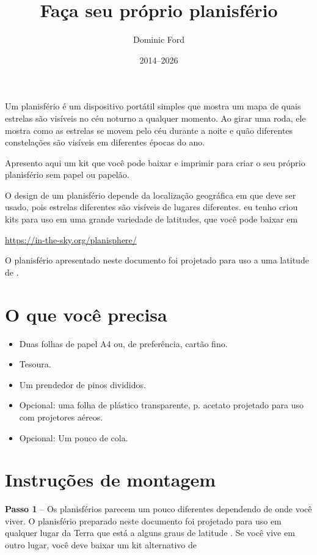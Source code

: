 \documentclass[a4paper,onecolumn,10pt]{article}
\title{Faça seu próprio planisfério}
\author{Dominic Ford}
\date{2014--2026}
\begin{document}
\maketitle
\setcounter{footnote}{1}

Um planisfério é um dispositivo portátil simples que mostra um mapa de quais estrelas 
são visíveis no céu noturno a qualquer momento. Ao girar uma roda, ele mostra
como as estrelas se movem pelo céu durante a noite e quão diferentes
constelações são visíveis em diferentes épocas do ano.

Apresento aqui um kit que você pode baixar e imprimir para criar o seu próprio
planisfério sem papel ou papelão.

O design de um planisfério depende da localização geográfica em que deve
ser usado, pois estrelas diferentes são visíveis de lugares diferentes. eu tenho
criou kits para uso em uma grande variedade de latitudes, que você pode baixar em

\url{https://in-the-sky.org/planisphere/}

O planisfério apresentado neste documento foi projetado para uso a uma latitude de
.
 
\section*{O que você precisa}

\begin{itemize}
\item Duas folhas de papel A4 ou, de preferência, cartão fino.
\item Tesoura.
\item Um prendedor de pinos divididos.
\item Opcional: uma folha de plástico transparente, p. acetato projetado para uso 
com projetores aéreos.
\item Opcional: Um pouco de cola.
\end{itemize}

\section*{Instruções de montagem}

{\bf Passo 1} -- Os planisférios parecem um pouco diferentes dependendo de onde você 
viver. O planisfério preparado neste documento foi projetado para uso em qualquer 
lugar da Terra que está a alguns graus de latitude . Se você vive
em outro lugar, você deve baixar um kit alternativo de
\end{document}
